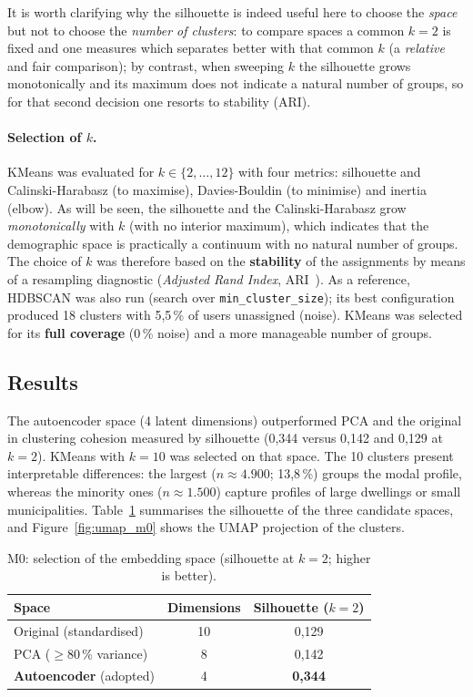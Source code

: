 It is worth clarifying why the silhouette is indeed useful here to choose the \emph{space} but not to choose the \emph{number of clusters}: to compare spaces a common $k=2$ is fixed and one measures which separates better with that common $k$ (a \emph{relative} and fair comparison); by contrast, when sweeping $k$ the silhouette grows monotonically and its maximum does not indicate a natural number of groups, so for that second decision one resorts to stability (ARI).

\paragraph{Selection of $k$.} KMeans was evaluated for $k \in \{2,\ldots,12\}$ with four metrics: silhouette and Calinski-Harabasz (to maximise), Davies-Bouldin (to minimise) and inertia (elbow). As will be seen, the silhouette and the Calinski-Harabasz grow \emph{monotonically} with $k$ (with no interior maximum), which indicates that the demographic space is practically a continuum with no natural number of groups. The choice of $k$ was therefore based on the \textbf{stability} of the assignments by means of a resampling diagnostic (\textit{Adjusted Rand Index}, ARI~\cite{hubert1985}). As a reference, HDBSCAN was also run (search over \texttt{min\_cluster\_size}); its best configuration produced 18 clusters with 5,5\,\% of users unassigned (noise). KMeans was selected for its \textbf{full coverage} (0\,\% noise) and a more manageable number of groups.

\subsection{Results}

The autoencoder space (4 latent dimensions) outperformed PCA and the original in clustering cohesion measured by silhouette (0,344 versus 0,142 and 0,129 at $k=2$). KMeans with $k=10$ was selected on that space. The 10 clusters present interpretable differences: the largest ($n\approx4.900$; 13,8\,\%) groups the modal profile, whereas the minority ones ($n\approx1.500$) capture profiles of large dwellings or small municipalities. Table~\ref{tab:m0_space} summarises the silhouette of the three candidate spaces, and Figure~\ref{fig:umap_m0} shows the UMAP projection of the clusters.

\begin{table}[htbp]
\centering
\caption{M0: selection of the embedding space (silhouette at $k=2$; higher is better).}
\label{tab:m0_space}
\begin{tabular}{lcc}
\toprule
\textbf{Space} & \textbf{Dimensions} & \textbf{Silhouette ($k{=}2$)} \\
\midrule
Original (standardised)        & 10 & 0,129 \\
PCA ($\geq$80\,\% variance)     & 8  & 0,142 \\
\textbf{Autoencoder} (adopted) & 4  & \textbf{0,344} \\
\bottomrule
\end{tabular}
\end{table}

